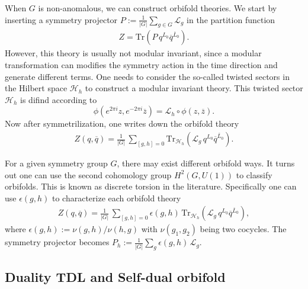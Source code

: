 \documentclass[submission, PhysLectNotes]{SciPost}
\begin{document}
When $G$ is non-anomalous, we can construct orbifold theories. We start by inserting a symmetry projector $P := \frac{1}{|G|} \sum_{g \in G} \mathcal{L}_g$ in the partition function 
\begin{equation}
	\begin{aligned}
		Z = \mathrm{Tr}\left( P\,q^{L_0} \overline{q}^{\overline{L}_0} \right).
	\end{aligned}
\end{equation}
However, this theory is usually not modular invariant, since a modular transformation can modifies the symmetry action in the time direction and generate different terms. One needs to consider the so-called twisted sectors in the Hilbert space $\mathcal{H}_h$ to construct a modular invariant theory. This twisted sector $\mathcal{H}_h$ is difind according to
\begin{equation}
	\phi(e^{2\pi i}z,e^{-2\pi i}\overline{z}) = \mathcal{L}_h \circ \phi(z,\overline{z}).
\end{equation}
Now after symmetrilization, one writes down the orbifold theory
\begin{equation}
	\begin{aligned}
		Z(q,\overline{q}) = \frac{1}{|G|}\,\sum_{[g,h]=0}\mathrm{Tr}_{\mathcal{H}_h}\left( \mathcal{L}_g \, q^{L_0} \overline{q}^{\overline{L}_0} \right).
	\end{aligned}
\end{equation}

For a given symmetry group $G$, there may exist different orbifold ways. It turns out one can use the second cohomology group $H^2(G,U(1))$ to classify orbifolds. This is known as discrete torsion in the literature. Specifically one can use $\epsilon(g,h)$ to characterize each orbifold theory
\begin{equation}
	\begin{aligned}
		Z(q,\overline{q}) = \frac{1}{|G|} \, \sum_{[g,h]=0} \epsilon(g,h) \, \mathrm{Tr}_{\mathcal{H}_h}\left( \mathcal{L}_g \, q^{L_0} \overline{q}^{\overline{L}_0} \right),
	\end{aligned}
\end{equation}
where $\epsilon(g,h) := \nu(g,h)/\nu(h,g)$ with $\nu(g_1,g_2)$ being two cocycles. The symmetry projector becomes $P_h := \frac{1}{|G|}\sum_g \epsilon(g,h)\,\mathcal{L}_g$. 

\subsection{Duality TDL and Self-dual orbifold}
\end{document}
